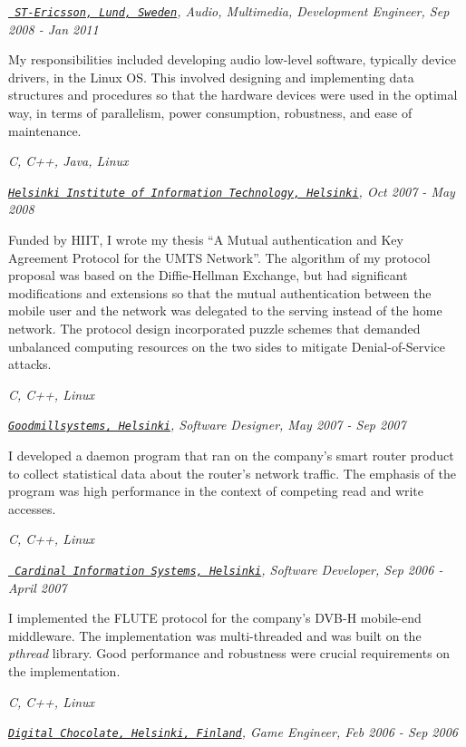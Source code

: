 \documentclass[a4paper]{twentysecondcv} %
\newenvironment{aperiod}{
  \begin{list}{}{
    \setlength{\leftmargin}{1.5em}
    \setlength{\itemsep}{1em}
    \setlength{\parskip}{0pt}
    \setlength{\parsep}{0.25em}
  }
}{
  \end{list}
}
\begin{document}
\begin{aperiod}
\item {\it \href{http://www.stericsson.com}{\tt
      ST-Ericsson, Lund, Sweden}, Audio, Multimedia, Development
    Engineer, Sep 2008 - Jan 2011}

  My responsibilities included developing audio low-level software,
  typically device drivers, in the Linux OS. This involved designing and
  implementing data structures and procedures so that the hardware
  devices were used in the optimal way, in terms of parallelism,
  power consumption, robustness, and ease of maintenance.

  {\it C, C++, Java, Linux}
\item {\it \href{http://www.hiit.fi}{\tt Helsinki
      Institute of Information Technology, Helsinki}, Oct 2007 - May 2008}

  Funded by HIIT, I wrote my thesis ``A Mutual authentication and Key
  Agreement Protocol for the UMTS Network''. The algorithm of my
  protocol proposal was based on the Diffie-Hellman Exchange, but had
  significant modifications and extensions so that the mutual
  authentication between the mobile user and the network was delegated
  to the serving instead of the home network. The protocol design
  incorporated puzzle schemes that demanded unbalanced computing
  resources on the two sides to mitigate Denial-of-Service attacks.
  
  {\it C, C++, Linux}
\item {\it
    \href{http://www.goodmillsystems.com}{\tt Goodmillsystems,
      Helsinki}, Software Designer, May 2007 - Sep 2007}

  I developed a daemon program that ran on the company's smart router
  product to collect statistical data about the router's network
  traffic. The emphasis of the program was high performance in the
  context of competing read and write accesses.

  {\it C, C++, Linux}
\item {\it \href{http://www.cardinal.fi/}{\tt
      Cardinal Information Systems, Helsinki}, Software
    Developer, Sep 2006 - April 2007}

  I implemented the FLUTE protocol for the company's DVB-H
  mobile-end middleware. The implementation was multi-threaded and was
  built on the {\it pthread} library. Good performance and robustness
  were crucial requirements on the implementation.

  {\it C, C++, Linux}
\item {\it
    \href{http://www.digitalchocolate.com/}{\tt Digital Chocolate,
      Helsinki, Finland}, Game Engineer, Feb 2006 - Sep 2006}


\end{aperiod}
\end{document}
